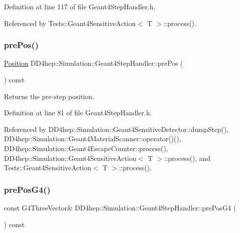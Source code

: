 Definition at line 117 of file Geant4\+Step\+Handler.\+h.



Referenced by Tests\+::\+Geant4\+Sensitive\+Action$<$ T $>$\+::process().

\hypertarget{class_d_d4hep_1_1_simulation_1_1_geant4_step_handler_ad168390a8f6da55740c092686d2c9f84}{}\label{class_d_d4hep_1_1_simulation_1_1_geant4_step_handler_ad168390a8f6da55740c092686d2c9f84} 
\subsubsection{\texorpdfstring{pre\+Pos()}{prePos()}}
{\footnotesize\ttfamily \hyperlink{namespace_d_d4hep_1_1_geometry_a55083902099d03506c6db01b80404900}{Position} D\+D4hep\+::\+Simulation\+::\+Geant4\+Step\+Handler\+::pre\+Pos (\begin{DoxyParamCaption}{ }\end{DoxyParamCaption}) const\hspace{0.3cm}{\ttfamily [inline]}}



Returns the pre-\/step position. 



Definition at line 81 of file Geant4\+Step\+Handler.\+h.



Referenced by D\+D4hep\+::\+Simulation\+::\+Geant4\+Sensitive\+Detector\+::dump\+Step(), D\+D4hep\+::\+Simulation\+::\+Geant4\+Material\+Scanner\+::operator()(), D\+D4hep\+::\+Simulation\+::\+Geant4\+Escape\+Counter\+::process(), D\+D4hep\+::\+Simulation\+::\+Geant4\+Sensitive\+Action$<$ T $>$\+::process(), and Tests\+::\+Geant4\+Sensitive\+Action$<$ T $>$\+::process().

\hypertarget{class_d_d4hep_1_1_simulation_1_1_geant4_step_handler_a087079e78925eeaedf2e20c394c5c820}{}\label{class_d_d4hep_1_1_simulation_1_1_geant4_step_handler_a087079e78925eeaedf2e20c394c5c820} 
\subsubsection{\texorpdfstring{pre\+Pos\+G4()}{prePosG4()}}
{\footnotesize\ttfamily const G4\+Three\+Vector\& D\+D4hep\+::\+Simulation\+::\+Geant4\+Step\+Handler\+::pre\+Pos\+G4 (\begin{DoxyParamCaption}{ }\end{DoxyParamCaption}) const\hspace{0.3cm}{\ttfamily [inline]}}



